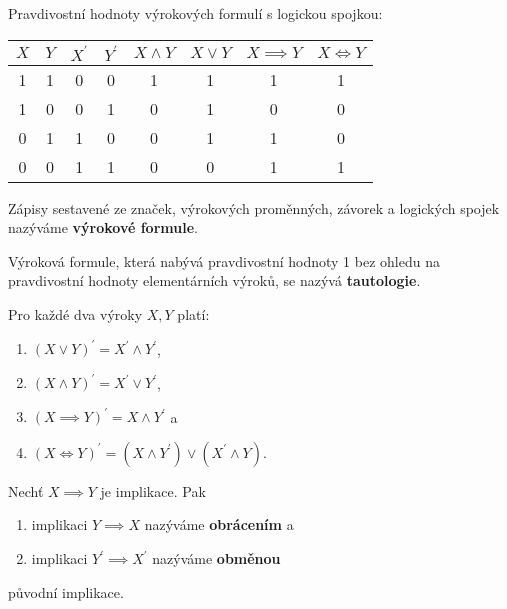 \begin{pozn}
  Pravdivostní hodnoty výrokových formulí s logickou spojkou:
  \begin{center}
    \begin{tabular}{c c | c c | c c c c}
      $X$ & $Y$ & $X^\prime$ & $Y^\prime$ & $X\land Y$ & $X\lor Y$ & $X\implies Y$ & $X\iff Y$ \\
      \hline
      1 & 1 & 0 & 0 & 1 & 1 & 1 & 1 \\
      1 & 0 & 0 & 1 & 0 & 1 & 0 & 0 \\
      0 & 1 & 1 & 0 & 0 & 1 & 1 & 0 \\
      0 & 0 & 1 & 1 & 0 & 0 & 1 & 1 \\
    \end{tabular}
  \end{center}
\end{pozn}

\begin{definition}
  Zápisy sestavené ze značek, výrokových proměnných, závorek a logických spojek nazýváme \textbf{výrokové formule}.
\end{definition}

\begin{definition}
  Výroková formule, která nabývá pravdivostní hodnoty 1 bez ohledu na pravdivostní hodnoty elementárních výroků, se nazývá \textbf{tautologie}.
\end{definition}

\begin{veta}
  Pro každé dva výroky $X,Y$ platí:
  \begin{enumerate}[$i.$]
    \item $(X\lor Y)^\prime = X^\prime \land Y^\prime$,
    \item $(X\land Y)^\prime = X^\prime \lor Y^\prime$,
    \item $(X\implies Y)^\prime = X\land Y^\prime$ a
    \item $(X\iff Y)^\prime = (X\land Y^\prime) \lor (X^\prime \land Y)$.
  \end{enumerate}
\end{veta}

\begin{definition}
  Nechť $X\implies Y$ je implikace. Pak
  \begin{enumerate}[$i.$]
    \item implikaci $Y\implies X$ nazýváme \textbf{obrácením} a
    \item implikaci $Y^\prime \implies X^\prime$ nazýváme \textbf{obměnou}
  \end{enumerate}
  původní implikace.
\end{definition}

